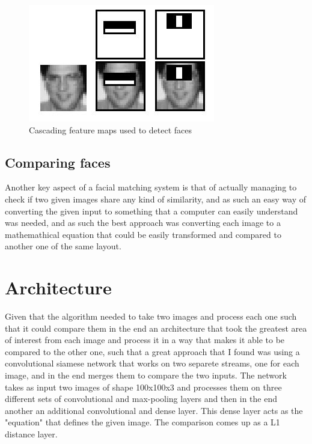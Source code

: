 \documentclass[12pt]{article} %
\begin{document}
	
	\begin{figure}[!htbp]
	
	\includegraphics{cascading_features}
	\caption{Cascading feature maps used to detect faces}

	\end{figure}

	\FloatBarrier

\subsection{Comparing faces}

	Another key aspect of a facial matching system is that of actually managing to check if two given images share any kind of similarity, and as such an easy way of converting the given input to something that a computer can easily understand was needed, and as such the best approach was converting each image to a mathemathical equation \cite{v3}\cite{a1} that could be easily transformed and compared to another one of the same layout.




\section{Architecture}

	Given that the algorithm needed to take two images and process each one such that it could compare them in the end an architecture that took the greatest area of interest from each image and process it in a way that makes it able to be compared to the other one, such that a great approach that I found was using a convolutional siamese network \cite{a4} that works on two separete streams, one for each image, and in the end merges them to compare the two inputs.
	The network takes as input two images of shape 100x100x3 and processes them on three different sets of convolutional and max-pooling layers and then in the end another an additional convolutional and dense layer. This dense layer acts as the "equation" \cite{v3}\cite{a1}  that defines the given image. The comparison comes up as a L1 distance layer.
\end{document}
